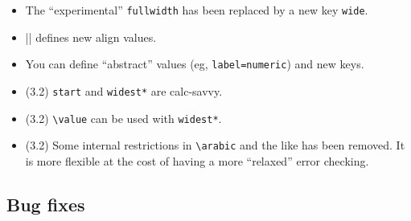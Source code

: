\documentclass[a4paper]{ltxguide}
\newcommand\3{\unskip\enspace\fbox{\fontsize{4}{4}\selectfont NEW 3.0}}
\begin{document}
\begin{enumerate}[leftmargin=*]
\begin{enumerate}[leftmargin=\parindent]
\begin{enumerate}[labelindent=\parindent,|\allowbreak
| leftmargin=*,|\allowbreak| label=\Roman*.,|\allowbreak
| widest=IV,|\allowbreak| align=left]
\begin{enumerate}[label=\fbox{\arabic*}]
\begin{itemize}
\item The ``experimental'' \verb|fullwidth| has been replaced by a new key
\verb|wide|.

\item|\SetLabelAlign| defines new align values.

\item You can define ``abstract'' values (eg, \verb|label=numeric|) and
new keys.
\end{itemize}

\begin{itemize}
\item (3.2) \verb|start| and \verb|widest*| are \textsf{calc}-savvy.
\item (3.2) \verb|\value| can be used with \verb|widest*|.
\item (3.2) Some internal restrictions in \verb|\arabic| and the like
has been removed.  It is more flexible at the cost of having a more
``relaxed'' error checking.
\end{itemize}
\subsection{Bug fixes}


\end{enumerate}
\end{enumerate}
\end{enumerate}
\end{enumerate}
\end{document}
